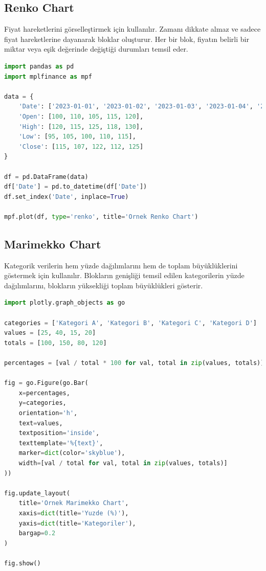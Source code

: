 \newpage

\subsection{Renko Chart}
Fiyat hareketlerini görselleştirmek için kullanılır. Zamanı dikkate almaz ve sadece fiyat hareketlerine dayanarak bloklar oluşturur. Her bir blok, fiyatın belirli bir miktar veya eşik değerinde değiştiği durumları temsil eder.

\begin{lstlisting}[language=Python]
import pandas as pd
import mplfinance as mpf

data = {
    'Date': ['2023-01-01', '2023-01-02', '2023-01-03', '2023-01-04', '2023-01-05'],
    'Open': [100, 110, 105, 115, 120],
    'High': [120, 115, 125, 118, 130],
    'Low': [95, 105, 100, 110, 115],
    'Close': [115, 107, 122, 112, 125]
}

df = pd.DataFrame(data)
df['Date'] = pd.to_datetime(df['Date'])
df.set_index('Date', inplace=True)

mpf.plot(df, type='renko', title='Ornek Renko Chart')
\end{lstlisting}

\newpage

\subsection{Marimekko Chart}
Kategorik verilerin hem yüzde dağılımlarını hem de toplam büyüklüklerini göstermek için kullanılır. Blokların genişliği temsil edilen kategorilerin yüzde dağılımlarını, blokların yüksekliği toplam büyüklükleri gösterir.

\begin{lstlisting}[language=Python]
import plotly.graph_objects as go

categories = ['Kategori A', 'Kategori B', 'Kategori C', 'Kategori D']
values = [25, 40, 15, 20]
totals = [100, 150, 80, 120]

percentages = [val / total * 100 for val, total in zip(values, totals)]

fig = go.Figure(go.Bar(
    x=percentages,
    y=categories,
    orientation='h',
    text=values,
    textposition='inside',
    texttemplate='%{text}',
    marker=dict(color='skyblue'),
    width=[val / total for val, total in zip(values, totals)]
))

fig.update_layout(
    title='Ornek Marimekko Chart',
    xaxis=dict(title='Yuzde (%)'),
    yaxis=dict(title='Kategoriler'),
    bargap=0.2 
)

fig.show()
\end{lstlisting}

